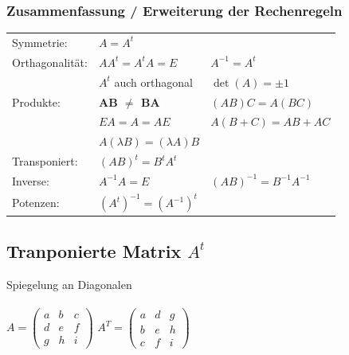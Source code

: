    			\subsubsection{Zusammenfassung / Erweiterung der Rechenregeln}
   			\begin{tabular}{lll}
   			Symmetrie: & $ A = A^t$ \\   			
   			Orthagonalität: &  $ A A^t = A^t A = E $  & $A^{-1} = A^t$\\
   			& $A^t$ auch orthagonal & $\det(A) = \pm 1$ \\
   			Produkte: & \textbf{AB $\neq$ BA} & $(AB)C = A(BC)$\\
   			& $EA = A = AE$  & $A(B + C) = AB + AC$\\
   			& $A (\lambda B) = (\lambda A) B$ & \\
   			Transponiert: & $(AB)^t = B^t A^t $ \\
   			Inverse: & $A^{-1} A = E$ & $(AB)^{-1} = B^{-1} A^{-1} $ \\
   			Potenzen: & $(A^t)^{-1} = (A^{-1})^t $ \\
   			\end{tabular}
		    
		    
		    \subsection{Tranponierte Matrix $A^t$}
		    Spiegelung an Diagonalen \\
		    \\
		    $A=\begin{pmatrix}
				a&b&c\\
				d&e&f\\
				g&h&i
			\end{pmatrix}$ \quad $ A^T =\begin{pmatrix}
				a&d&g\\
				b&e&h\\
				c&f&i
			\end{pmatrix}$    
		        
		        
